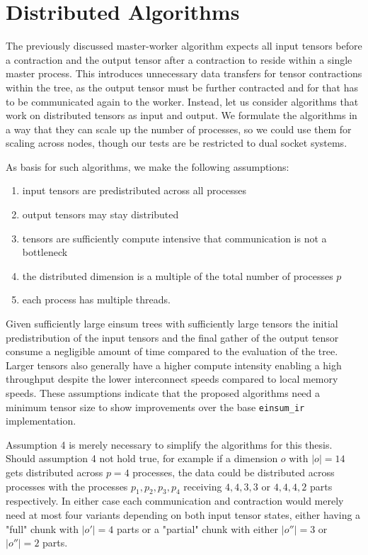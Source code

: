 \section{Distributed Algorithms}
\label{sec:n_nodes}

The previously discussed master-worker algorithm expects all input tensors before a contraction and the output tensor after a contraction to reside within a single master process.
This introduces unnecessary data transfers for tensor contractions within the tree, as the output tensor must be further contracted and for that has to be communicated again to the worker.
Instead, let us consider algorithms that work on distributed tensors as input and output.
We formulate the algorithms in a way that they can scale up the number of processes, so we could use them for scaling across nodes, though our tests are be restricted to dual socket systems.

As basis for such algorithms, we make the following assumptions:
\begin{enumerate}
    \item input tensors are predistributed across all processes
    \item output tensors may stay distributed
    \item tensors are sufficiently compute intensive that communication is not a bottleneck
    \item the distributed dimension is a multiple of the total number of processes $p$
    \item each process has multiple threads.
\end{enumerate}

Given sufficiently large einsum trees with sufficiently large tensors the initial predistribution of the input tensors and the final gather of the output tensor consume a negligible amount of time compared to the evaluation of the tree.
Larger tensors also generally have a higher compute intensity enabling a high throughput despite the lower interconnect speeds compared to local memory speeds.
These assumptions indicate that the proposed algorithms need a minimum tensor size to show improvements over the base \texttt{einsum\_ir} implementation.

Assumption 4 is merely necessary to simplify the algorithms for this thesis.
Should assumption 4 not hold true, for example if a dimension $o$ with $|o|=14$ gets distributed across $p=4$ processes, the data could be distributed across processes with the processes $p_1,p_2,p_3,p_4$ receiving $4,4,3,3$ or $4,4,4,2$ parts respectively.
In either case each communication and contraction would merely need at most four variants depending on both input tensor states, either having a "full" chunk with $|o'|=4$ parts or a "partial" chunk with either $|o''|=3$ or $|o''|=2$ parts.

